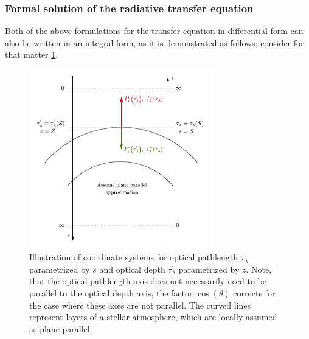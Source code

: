 \documentclass[a4paper,11pt]{report}
\begin{document}
\subsubsection{Formal solution of the radiative transfer equation}
Both of the above formulations for the transfer equation in differential form can also be written in an integral form, as it is demonstrated as follows; consider for that matter \cref{fig:outward-inward-radiation}.
\begin{figure}[h!]
\centering
\includegraphics[width=8cm]{figures/outward-inward-radiation.pdf}
\caption{Illustration of coordinate systems for optical pathlength $\tau_\lambda$ parametrized by $s$ and optical depth $\tau_\lambda^\prime$ parametrized by $z$. Note, that the optical pathlength axis does not necessarily need to be parallel to the optical depth axis, the factor $\cos(\theta)$ corrects for the case where these axes are not parallel. The curved lines represent layers of a stellar atmosphere, which are locally assumed as plane parallel.}
\label{fig:outward-inward-radiation}
\end{figure}
\end{document}
